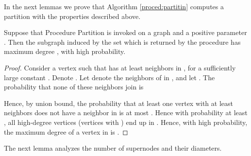 \documentclass[11pt]{article}
\begin{document}
In the next lemmas we prove that Algorithm \ref{proced:partitin} computes a partition with the properties described above.
\begin{lem}
Suppose that Procedure Partition is invoked on a graph  and a positive parameter . Then the subgraph  induced by the set  which is returned by the procedure has maximum degree , with high probability.
\end{lem}
\begin{proof}
Consider a vertex  such that  has at least  neighbors in , for a sufficiently large constant . Denote . Let  denote the neighbors of  in , and let . 
The probability that none of these neighbors join  is

Hence, by union bound, the probability that at least one vertex  with at least  neighbors does not have a neighbor in  is at most . Hence with probability at least , all high-degree vertices (vertices with ) end up in . Hence, with high probability, the maximum degree of a vertex in  is .
\end{proof}
The next lemma analyzes the number of supernodes and their diameters.
\end{document}
